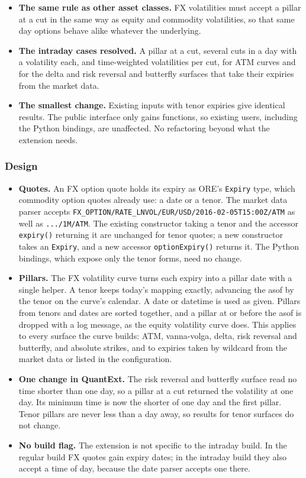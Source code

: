 \documentclass[12pt, a4paper]{article}
\begin{document}
\begin{itemize}
\item \textbf{The same rule as other asset classes.} FX volatilities must accept a pillar at a cut in the same way as
  equity and commodity volatilities, so that same day options behave alike whatever the underlying.
\item \textbf{The intraday cases resolved.} A pillar at a cut, several cuts in a day with a volatility each, and
  time-weighted volatilities per cut, for ATM curves and for the delta and risk reversal and butterfly surfaces that take
  their expiries from the market data.
\item \textbf{The smallest change.} Existing inputs with tenor expiries give identical results. The public interface
  only gains functions, so existing users, including the Python bindings, are unaffected. No refactoring beyond what
  the extension needs.
\end{itemize}

\subsubsection*{Design}

\begin{itemize}
\item \textbf{Quotes.} An FX option quote holds its expiry as ORE's \texttt{Expiry} type, which commodity option quotes
  already use: a date or a tenor. The market data parser accepts
  \texttt{FX\_OPTION/RATE\_LNVOL/EUR/USD/2016-02-05T15:00Z/ATM} as well as \texttt{.../1M/ATM}. The existing
  constructor taking a tenor and the accessor \texttt{expiry()} returning it are unchanged for tenor quotes; a new
  constructor takes an \texttt{Expiry}, and a new accessor \texttt{optionExpiry()} returns it. The Python bindings,
  which expose only the tenor forms, need no change.
\item \textbf{Pillars.} The FX volatility curve turns each expiry into a pillar date with a single helper. A tenor keeps
  today's mapping exactly, advancing the asof by the tenor on the curve's calendar. A date or datetime is used as given.
  Pillars from tenors and dates are sorted together, and a pillar at or before the asof is dropped with a log message,
  as the equity volatility curve does. This applies to every surface the curve builds: ATM, vanna-volga, delta, risk
  reversal and butterfly, and absolute strikes, and to expiries taken by wildcard from the market data or listed in the
  configuration.
\item \textbf{One change in QuantExt.} The risk reversal and butterfly surface read no time shorter than one day, so a
  pillar at a cut returned the volatility at one day. Its minimum time is now the shorter of one day and the first
  pillar. Tenor pillars are never less than a day away, so results for tenor surfaces do not change.
\item \textbf{No build flag.} The extension is not specific to the intraday build. In the regular build FX quotes gain
  expiry dates; in the intraday build they also accept a time of day, because the date parser accepts one there.
\end{itemize}
\end{document}
